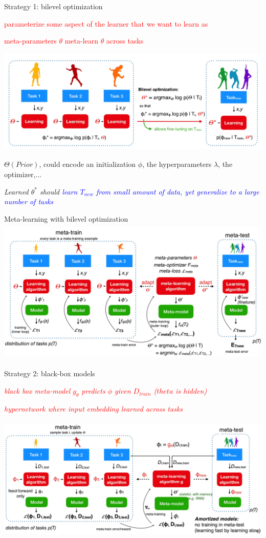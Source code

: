 \documentclass[aspectratio=169,t,handout,xcolor={usenames,dvipsnames}]{beamer}
\begin{document}
\begin{frame}{Strategy 1: bilevel optimization}

    \centerline{\textcolor{red}{parameterize some aspect of the learner that we want to learn as}} 
    \centerline{\textcolor{red}{meta-parameters $\theta$ meta-learn $\theta$ across tasks}}
    \centering\includegraphics[height=5cm]{image/Jietu20220329-000908.jpg}
    \small\centerline{$\Theta(Prior)$, could encode an initialization $\phi$, the hyperparameters $\lambda$, the optimizer,...}
    \leavevmode\hphantom{ }

    \small\centerline{\textit{Learned $\theta^*$ should \textcolor{blue}{learn $T_{new}$ from small amount of data, yet generalize to a large number of tasks}}}
\end{frame}

\begin{frame}{Meta-learning with bilevel optimization}
    \centering\includegraphics[height=7cm]{image/Jietu20220329-002035.jpg}
\end{frame}
\begin{frame}{Strategy 2: black-box models}

    \centerline{\textit{\textcolor{red}{black box meta-model $g_\theta$ predicts $\phi$ given $D_{train}$ ($theta$ is hidden)}}}
    \centerline{\textit{\textcolor{red}{hypernetwork where input embedding learned across tasks}}}
    \centering\includegraphics[height=6cm]{image/Jietu20220329-002812.jpg}
\end{frame}
\end{document}
